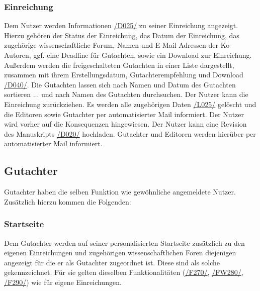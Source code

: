 \subsubsection{Einreichung}
\begin{description}
     Dem Nutzer werden Informationen \hyperref[d025]{/D025/} zu seiner Einreichung angezeigt.
    Hierzu gehören der Status der Einreichung, das Datum der Einreichung, das zugehörige
    wissenschaftliche Forum, Namen und E-Mail Adressen der Ko-Autoren, ggf. eine Deadline für Gutachten,
    sowie ein Download zur Einreichung.
     Außerdem werden die freigeschalteten Gutachten in einer
    Liste dargestellt, zusammen mit ihrem Erstellungsdatum, Gutachterempfehlung und Download \hyperref[d040]{/D040/}.
     Die Gutachten lassen sich nach Namen und Datum
    des Gutachten sortieren
    ... und nach Namen des Gutachten durchsuchen.
     Der Nutzer kann die Einreichung zurückziehen. Es werden alle zugehörigen Daten
    \hyperref[leist:025]{/L025/} gelöscht und die Editoren sowie Gutachter per automatisierter Mail informiert.
    Der Nutzer wird vorher auf die Konsequenzen hingewiesen.
     Der Nutzer kann eine Revision des Manuskripts \hyperref[d020]{/D020/} hochladen.
    Gutachter und Editoren werden hierüber per automatisierter Mail informiert.
\end{description}

\subsection{Gutachter}\label{funkt:Gutachter}
Gutachter haben die selben Funktion wie gewöhnliche angemeldete Nutzer. Zusätzlich hierzu kommen die Folgenden:

\subsubsection{Startseite}
\begin{description}
     Dem Gutachter werden auf seiner personalisierten Startseite zusätzlich zu den eigenen
    Einreichungen und zugehörigen wissenschaftlichen Foren diejenigen angezeigt für die er als Gutachter
    zugeordnet ist. Diese sind als solche gekennzeichnet.
    Für sie gelten dieselben Funktionalitäten (\hyperref[funkt:270]{/F270/}, \hyperref[funkt:280]{/FW280/}, \hyperref[funkt:290]{/F290/})
    wie für eigene Einreichungen.
\end{description}

